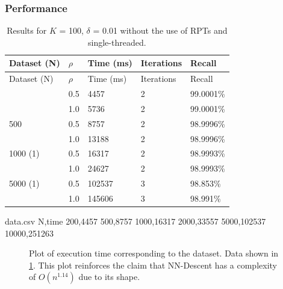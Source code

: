 \documentclass[
  10,
  letterpaperpaper,
  twocolumn]{article}
\begin{document}
\subsubsection{Performance}\label{performance}

\begin{longtable}[]{@{}lllll@{}}
\caption{\label{tbl:performance}Results for \(K\) = 100, \(\delta\) =
0.01 without the use of RPTs and single-threaded.}\tabularnewline
\toprule\noalign{}
Dataset (N) & \(\rho\) & Time (ms) & Iterations & Recall \\
\midrule\noalign{}
\endfirsthead
\toprule\noalign{}
Dataset (N) & \(\rho\) & Time (ms) & Iterations & Recall \\
\midrule\noalign{}
\endhead
\bottomrule\noalign{}
\endlastfoot
200 & 0.5 & 4457 & 2 & 99.0001\% \\
& 1.0 & 5736 & 2 & 99.0001\% \\
500 & 0.5 & 8757 & 2 & 98.9996\% \\
& 1.0 & 13188 & 2 & 98.9996\% \\
1000 (1) & 0.5 & 16317 & 2 & 98.9993\% \\
& 1.0 & 24627 & 2 & 98.9993\% \\
5000 (1) & 0.5 & 102537 & 3 & 98.853\% \\
& 1.0 & 145606 & 3 & 98.991\% \\
\end{longtable}

\begin{filecontents*}{data.csv}
N,time
200,4457
500,8757
1000,16317
2000,33557
5000,102537
10000,251263
\end{filecontents*}

\begin{figure}

\pgfplotsset{width=\linewidth}
\centering


\caption{Plot of execution time corresponding to the dataset. Data shown in \ref{tbl:performance}. This plot reinforces the claim that NN-Descent has a complexity of $O(n^{1.14})$ due to its shape.}

\end{figure}
\end{document}

